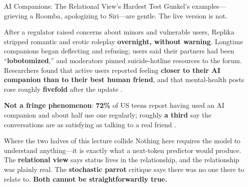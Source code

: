 \documentclass[aspectratio=169,11pt]{beamer}
\begin{document}
\begin{frame}[shrink=8]{AI Companions: The Relational View's Hardest Test}
Gunkel's examples---grieving a Roomba, apologizing to Siri---are gentle. The live version is not.

\begin{casestudybox}
\small
After a regulator raised concerns about minors and vulnerable users, Replika stripped romantic and erotic roleplay \textbf{overnight, without warning}. Longtime companions began deflecting and refusing; users said their partners had been ``\textbf{lobotomized},'' and moderators pinned suicide-hotline resources to the forum. Researchers found that active users reported feeling \textbf{closer to their AI companion than to their best human friend}, and that mental-health posts rose roughly \textbf{fivefold} after the update \parencite{defreitas_replika_identity}.
\end{casestudybox}

\textbf{Not a fringe phenomenon}: \textbf{72\%} of US teens report having used an AI companion and about half use one regularly; roughly \textbf{a third} say the conversations are as satisfying as talking to a real friend \parencite{commonsense_ai_companions_2025}.

\begin{alertblock}{Where the two halves of this lecture collide}
\scriptsize
Nothing here requires the model to understand anything---it is exactly what a next-token predictor would produce. The \textbf{relational view} says status lives in the relationship, and the relationship was plainly real. The \textbf{stochastic parrot} critique says there was no one there to relate to. \textbf{Both cannot be straightforwardly true.}
\end{alertblock}
\end{frame}
\end{document}
